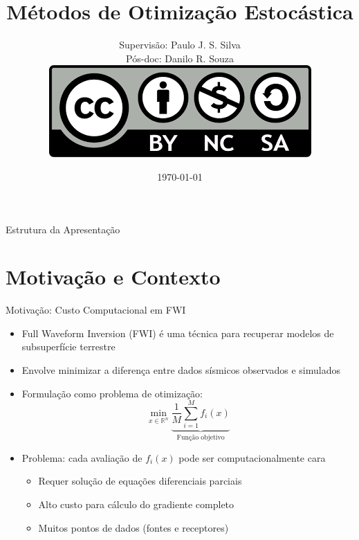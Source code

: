 \documentclass[aspectratio=1610]{beamer}
\title[Métodos de Otimização Estocástica]{\huge Métodos de Otimização Estocástica}
\author[SEMINÁRIO DE OTIMIZAÇÃO CONTÍNUA]{%
  \texorpdfstring{%
    Supervisão: Paulo J. S. Silva \\ 
    Pós-doc: Danilo R. Souza\vspace{1em}\\
    \href{https://creativecommons.org/licenses/by-nc-sa/4.0/}
    {\includegraphics[width=0.38\columnwidth]{figures/LicenceCC_BY-NC-SA4.png}}
  }{Supervisão: Paulo J. S. Silva, Pós-doc: Danilo R. Souza}%
}
\date{\today}
\newcommand{\R}{\mathbb{R}}
\begin{document}
\begin{frame}
\titlepage
\end{frame}

\begin{frame}{Estrutura da Apresentação}
\tableofcontents
\end{frame}

\section{Motiva\c{c}\~ao e Contexto}



\begin{frame}{Motivação: Custo Computacional em FWI}
\begin{itemize}
    \item Full Waveform Inversion (FWI) é uma técnica para recuperar modelos de subsuperfície terrestre \pause
    \item Envolve minimizar a diferença entre dados sísmicos observados e simulados \pause
    \item Formulação como problema de otimização:
    \begin{equation*}
        \min_{x \in \R^n} \underbrace{\frac{1}{M} \sum_{i=1}^{M} f_i(x)}_{\text{Função objetivo}}
    \end{equation*} \pause
    \item Problema: cada avaliação de $f_i(x)$ pode ser computacionalmente cara
    \begin{itemize}
        \item Requer solução de equações diferenciais parciais
        \item Alto custo para cálculo do gradiente completo
        \item Muitos pontos de dados (fontes e receptores)
    \end{itemize}
\end{itemize}
\end{frame}
\end{document}

